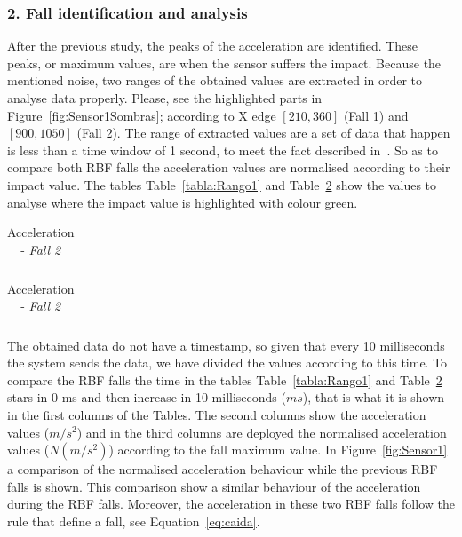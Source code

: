 \documentclass[conference]{IEEEtran}
\theoremstyle{definition}
\begin{document}
\subsubsection*{2. Fall identification and analysis} After the previous study, the peaks of the acceleration are identified. 
These peaks, or maximum values, are when the sensor suffers the impact. Because the mentioned noise, two ranges of the obtained 
values are extracted in order to analyse data properly. Please, see the highlighted parts in Figure~\ref{fig:Sensor1Sombras};
according to X edge $[210, 360]$ (Fall 1) and $[900, 1050]$ (Fall 2). The range of extracted values are a set of data that 
happen is less than a time window of 1 second, to meet the fact described in~\cite{Luder2009}. So as to compare both RBF falls
the acceleration values are normalised according to their impact value. The tables Table~\ref{tabla:Rango1} and Table~\ref{tabla:Rango2}
show the values to analyse where the impact value is highlighted with colour green.

\begin{table}[!h]
  \centering
  \begin{minipage}[t]{.48\textwidth}
    \centering
    \begin{tabular}{*{5}{r}}
      
    \end{tabular}
    \caption{Acceleration - \textit{Fall 1}}%
    \label{tabla:Rango1}
  \end{minipage}
  \hfill
  \begin{minipage}[t]{.48\textwidth}
    \centering
    \begin{tabular}{*{5}{r}}
      
    \end{tabular}
    \caption{Acceleration - \textit{Fall 2}}%
    \label{tabla:Rango2}
  \end{minipage}
\end{table}

The obtained data do not have a timestamp, so given that every 10 milliseconds the system sends the data, we have
divided the values according to this time. To compare the RBF falls the time in the tables Table~\ref{tabla:Rango1} 
and Table~\ref{tabla:Rango2} stars in 0 ms and then increase in 10 milliseconds ($ms$), that is what it is shown in 
the first columns of the Tables. The second columns show the acceleration values ($m/s^2$) and in the third columns
are deployed the normalised acceleration values ($N(m/s^2)$) according to the fall maximum value. In 
Figure~\ref{fig:Sensor1} a comparison of the normalised acceleration behaviour while the previous RBF falls is shown. 
This comparison show a similar behaviour of the acceleration during the RBF falls.
Moreover, the acceleration in these two RBF falls follow the rule that define a fall, see Equation~\ref{eq:caida}.
\end{document}
